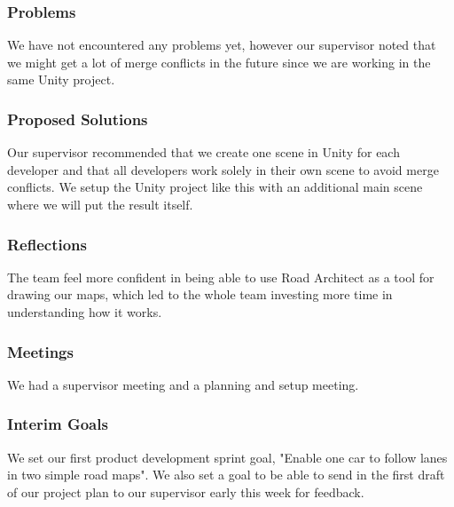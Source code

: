 \subsubsection{Problems}
    We have not encountered any problems yet, however our supervisor noted that we might get a lot of merge conflicts in the future since we are working in the same Unity project.

\subsubsection{Proposed Solutions}
    Our supervisor recommended that we create one scene in Unity for each developer and that all developers work solely in their own scene to avoid merge conflicts. We setup the Unity project like this with an additional main scene where we will put the result itself.

\subsubsection{Reflections}
The team feel more confident in being able to use Road Architect as a tool for drawing our maps, which led to the whole team investing more time in understanding how it works. 

\subsubsection{Meetings}
We had a supervisor meeting and a planning and setup meeting. 

\subsubsection{Interim Goals}
We set our first product development sprint goal, "Enable one car to follow lanes in two simple road maps". We also set a goal to be able to send in the first draft of our project plan to our supervisor early this week for feedback. 

